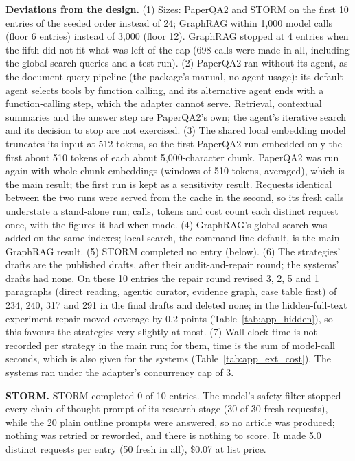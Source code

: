 \documentclass{article} %
\begin{document}
\textbf{Deviations from the design.} (1) Sizes: PaperQA2 and STORM on the first 10 entries of the seeded order instead of 24; GraphRAG within 1,000 model calls (floor 6 entries) instead of 3,000 (floor 12). GraphRAG stopped at 4 entries when the fifth did not fit what was left of the cap (698 calls were made in all, including the global-search queries and a test run). (2) PaperQA2 ran without its agent, as the document-query pipeline (the package's manual, no-agent usage): its default agent selects tools by function calling, and its alternative agent ends with a function-calling step, which the adapter cannot serve. Retrieval, contextual summaries and the answer step are PaperQA2's own; the agent's iterative search and its decision to stop are not exercised. (3) The shared local embedding model truncates its input at 512 tokens, so the first PaperQA2 run embedded only the first about 510 tokens of each about 5,000-character chunk. PaperQA2 was run again with whole-chunk embeddings (windows of 510 tokens, averaged), which is the main result; the first run is kept as a sensitivity result. Requests identical between the two runs were served from the cache in the second, so its fresh calls understate a stand-alone run; calls, tokens and cost count each distinct request once, with the figures it had when made. (4) GraphRAG's global search was added on the same indexes; local search, the command-line default, is the main GraphRAG result. (5) STORM completed no entry (below). (6) The strategies' drafts are the published drafts, after their audit-and-repair round; the systems' drafts had none. On these 10 entries the repair round revised 3, 2, 5 and 1 paragraphs (direct reading, agentic curator, evidence graph, case table first) of 234, 240, 317 and 291 in the final drafts and deleted none; in the hidden-full-text experiment repair moved coverage by 0.2 points (Table~\ref{tab:app_hidden}), so this favours the strategies very slightly at most. (7) Wall-clock time is not recorded per strategy in the main run; for them, time is the sum of model-call seconds, which is also given for the systems (Table~\ref{tab:app_ext_cost}). The systems ran under the adapter's concurrency cap of 3.

\textbf{STORM.} STORM completed 0 of 10 entries. The model's safety filter stopped every chain-of-thought prompt of its research stage (30 of 30 fresh requests), while the 20 plain outline prompts were answered, so no article was produced; nothing was retried or reworded, and there is nothing to score. It made 5.0 distinct requests per entry (50 fresh in all), \$0.07 at list price.
\end{document}
